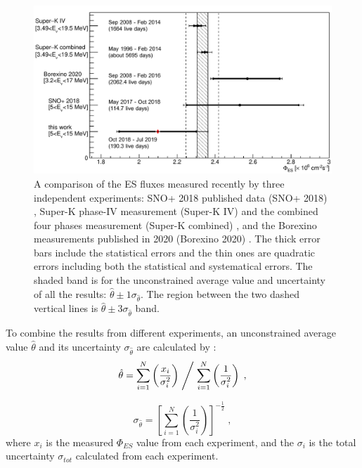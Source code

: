\begin{figure}[!htb]
	\centering
	\includegraphics[width=14cm]{ESfluxCompare.png}
	\caption[A comparison of the ES flux measured recently by three independent experiments.]{A comparison of the ES fluxes measured recently by three independent experiments: SNO+ 2018 published data (SNO+ 2018) \cite{anderson2019measurement}, Super-K phase-IV measurement (Super-K IV) and the combined four phases measurement (Super-K combined) \cite{abe2016solar}, and the Borexino measurements published in 2020 (Borexino 2020) \cite{agostini2020improved}. The thick error bars include the statistical errors and the thin ones are quadratic errors including both the statistical and systematical errors. The shaded band is for the unconstrained average value and uncertainty of all the results: $\hat \theta \pm 1\sigma_{\hat \theta}$. The region between the two dashed vertical lines is $\hat \theta \pm 3\sigma_{\hat \theta}$ band.\label{fig:ESfluxCompare}}
\end{figure}

To combine the results from different experiments, an unconstrained average value $\hat \theta$ and its uncertainty $\sigma_{\hat\theta}$ are calculated by \cite{pdg2020,behnke2013data}:
\begin{equation}
\hat \theta = \sum_{i=1}^{N} \left(\frac{x_i}{\sigma_i^2}\right)\Biggm/\sum_{i=1}^{N}\left(\frac{1}{\sigma_i^2}\right)\; ,
\end{equation}

\begin{equation}
\sigma_{\hat\theta} =\left[\sum_{i=1}^{N}\left(\frac{1}{\sigma_i^2}\right) \right]^{-\frac{1}{2}}\; ,
\end{equation}
where $x_i$ is the measured $\Phi_{ES}$ value from each experiment, and the $\sigma_i$ is the total uncertainty $\sigma_{tot}$ calculated from each experiment. 

